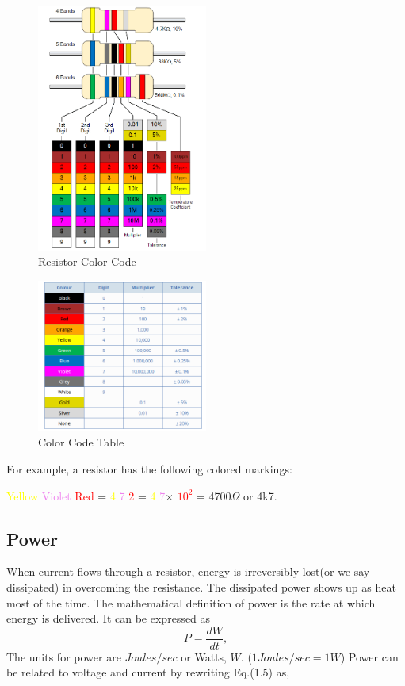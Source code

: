 \documentclass[a4 paper]{article}
\newcommand{\red}[1]{\textcolor{red}{#1}}
\newcommand{\yellow}[1]{\textcolor{yellow}{#1}}
\newcommand{\violet}[1]{\textcolor{violet}{#1}}
\numberwithin{equation}{section}
\newcommand{\0}{\mathbf{0}}
\begin{document}
\begin{figure}[!ht]
  \caption{Resistor Color Code}
  \centering
  \includegraphics[width=0.5\textwidth]{./images/ColourCode1}
\end{figure}

\vspace{8 mm}

\begin{figure}[!ht]
  \caption{Color Code Table}
  \centering
  \includegraphics[width=0.5\textwidth]{./images/ColourCode2}
\end{figure}
For example, a resistor has the following colored markings: \newline
\centerline{\yellow{Yellow} \violet{Violet} \red{Red} = \yellow{4} \violet{7} \red{2} = \yellow{4} \violet{7}$\times$ \red{$10^2$} = 4700$\Omega$ or 4k7.
}

\subsection{Power}
When current flows through a resistor, energy is irreversibly lost(or we say dissipated) in overcoming the resistance. The dissipated power shows up as heat most of the time. The mathematical definition of power is the rate at which energy is delivered. It can be expressed as
\begin{equation}
P = \frac{dW}{dt},
\end{equation}
The units for power are $Joules/sec$ or Watts, $W$. ($1 Joules/sec = 1 W$)
Power can be related to voltage and current by rewriting Eq.(1.5) as, 
\end{document}
